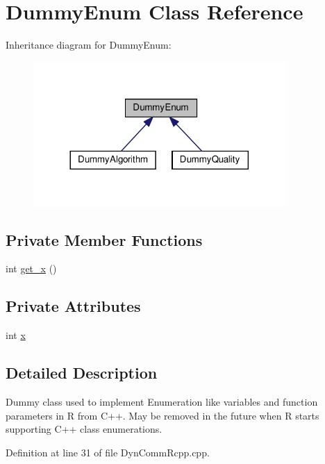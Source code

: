 \hypertarget{classDummyEnum}{}\section{Dummy\+Enum Class Reference}
\label{classDummyEnum}


Inheritance diagram for Dummy\+Enum\+:\nopagebreak
\begin{figure}[H]
\begin{center}
\leavevmode
\includegraphics[width=272pt]{classDummyEnum__inherit__graph}
\end{center}
\end{figure}
\subsection*{Private Member Functions}
\begin{DoxyCompactItemize}
\item 
int \hyperlink{classDummyEnum_a527da769af75620d1443857d2f300433}{get\+\_\+x} ()
\end{DoxyCompactItemize}
\subsection*{Private Attributes}
\begin{DoxyCompactItemize}
\item 
int \hyperlink{classDummyEnum_a0ad78287e6a1d56038b13370f313946c}{x}
\end{DoxyCompactItemize}


\subsection{Detailed Description}
Dummy class used to implement Enumeration like variables and function parameters in R from C++. May be removed in the future when R starts supporting C++ class enumerations. 

Definition at line 31 of file Dyn\+Comm\+Rcpp.\+cpp.



